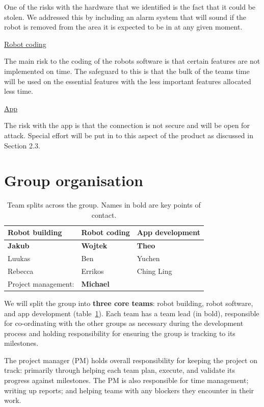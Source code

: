 \documentclass{article}
\begin{document}
One of the risks with the hardware that we identified is the fact that it could be stolen. We addressed this by including an alarm system that will sound if the robot is removed from the area it is expected to be in at any given moment.

\underline{Robot coding}

The main risk to the coding of the robots software is that certain features are not implemented on time. The safeguard to this is that the bulk of the teams time will be used on the essential features with the less important features allocated less time.

\underline{App}

The risk with the app is that the connection is not secure and will be open for attack. Special effort will be put in to this aspect of the product as discussed in Section 2.3.

\section{Group organisation}
\begin{table}[]
  \begin{tabular}{lll}
    \hline
    Robot building & Robot coding & App development   \\
    \hline
    {\bf Jakub}          & {\bf Wojtek}       & {\bf Theo}              \\
    Luukas         & Ben          & Yuchen            \\
    Rebecca        & Errikos      & Ching Ling \\
    \hline
    Project management: & {\bf Michael} & \\
  \end{tabular}
  \caption{Team splits across the group. Names in bold are key points of contact.}
  \label{tab:group-split}
\end{table}

We will split the group into {\bf three core teams}: robot building, robot software, and app development (table~\ref{tab:group-split}). Each team has a team lead (in bold), responsible for co-ordinating with the other groups as necessary during the development process and holding responsibility for ensuring the group is tracking to its milestones.

The project manager (PM) holds overall responsibility for keeping the project on track: primarily through helping each team plan, execute, and validate its progress against milestones. The PM is also responsible for time management; writing up reports; and helping teams with any blockers they encounter in their work.
\end{document}

